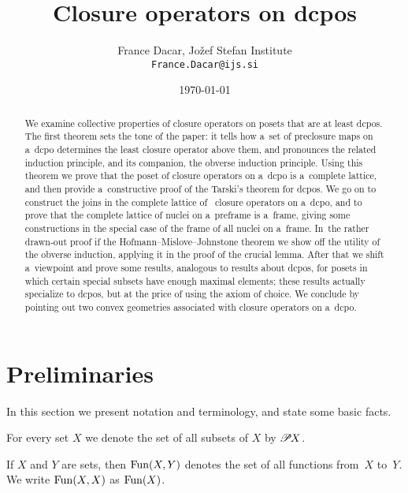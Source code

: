 \documentclass[11pt,letterpaper]{article}
\title{Closure operators on dcpos}
\author{France Dacar, Jo\v{z}ef Stefan Institute\\
	{\tt France.Dacar@ijs.si}}
\date{\today}
\begin{document}
\maketitle

\begin{abstract}
We examine collective properties of closure operators on posets that are at least dcpos.
The first theorem sets the tone of the paper:
it tells how a~set of preclosure maps on a~dcpo determines the least closure operator above them,
and pronounces the related induction principle, and its companion, the obverse induction principle.
Using this theorem we prove that the poset of closure operators on a~dcpo is a~complete lattice,
and then provide a~constructive proof of the Tarski's theorem for dcpos.
We go on to construct the joins
	in the complete lattice of \Scottcont\ closure operators on a~dcpo,
and to prove that the complete lattice of nuclei on a~preframe is a~frame,
giving some constructions in the special case of the frame of all nuclei on a~frame.
In~the rather drawn-out proof if the Hofmann--Mislove--Johnstone theorem
we show off the utility of the obverse induction, applying it in the proof of the crucial lemma.
After that we shift a~viewpoint and prove some results, analogous to results about dcpos,
for posets in which certain special subsets have enough maximal elements;
these results actually specialize to dcpos, but at the price of using the axiom of choice.
We conclude by pointing out two convex geometries associated with closure operators on a~dcpo.
\end{abstract}




\section{Preliminaries}
\label{sec:prelims}

In this section we present notation and terminology, and state some basic facts.

\txtskip

For every set $X$ we denote the set of all subsets of $X$ by $\mathscr{P}\mspace{-2mu} X$.

If $X$ and $Y$ are sets,
	then $\mathop{\smash{\mathrm{Fun}}}\nolimits(X,Y)$ denotes the set of all functions from~$X$ to~$Y$.
We write $\mathop{\smash{\mathrm{Fun}}}\nolimits(X,X)$ as $\mathop{\smash{\mathrm{Fun}}}\nolimits(X)$.
\end{document}
